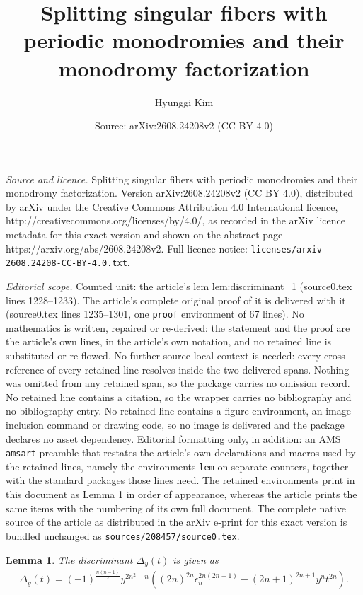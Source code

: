 \documentclass[10pt,a4paper]{amsart}
\title{Splitting singular fibers with periodic monodromies and their monodromy factorization}
\author{Hyunggi Kim}
\date{Source: arXiv:2608.24208v2 (CC BY 4.0)}
\newtheorem{lem}{Lemma}
\newcommand{\ep}{\epsilon}
\begin{document}
\maketitle

\noindent\emph{Source and licence.} Splitting singular fibers with periodic monodromies and their monodromy factorization. Version arXiv:2608.24208v2 (CC BY 4.0), distributed by arXiv under the Creative Commons Attribution 4.0 International licence, http://creativecommons.org/licenses/by/4.0/, as recorded in the arXiv licence metadata for this exact version and shown on the abstract page https://arxiv.org/abs/2608.24208v2. Full licence notice: \texttt{licenses/arxiv-2608.24208-CC-BY-4.0.txt}.\par\smallskip

\noindent\textit{Editorial scope.} Counted unit: the article's lem lem:discriminant\_1 (source0.tex lines 1228--1233). The article's complete original proof of it is delivered with it (source0.tex lines 1235--1301, one \texttt{proof} environment of 67 lines). No mathematics is written, repaired or re-derived: the statement and the proof are the article's own lines, in the article's own notation, and no retained line is substituted or re-flowed.  No further source-local context is needed: every cross-reference of every retained line resolves inside the two delivered spans.  Nothing was omitted from any retained span, so the package carries no omission record.  No retained line contains a citation, so the wrapper carries no bibliography and no bibliography entry.  No retained line contains a figure environment, an image-inclusion command or drawing code, so no image is delivered and the package declares no asset dependency.  Editorial formatting only, in addition: an AMS \texttt{amsart} preamble that restates the article's own declarations and macros used by the retained lines, namely the environments \texttt{lem} on separate counters, together with the standard packages those lines need.  The retained environments print in this document as Lemma 1 in order of appearance, whereas the article prints the same items with the numbering of its own full document.  The complete native source of the article as distributed in the arXiv e-print for this exact version is bundled unchanged as \texttt{sources/208457/source0.tex}.
\begin{lem} \label{lem:discriminant_1}
The discriminant $\Delta_y(t)$ is given as
\begin{align}
\Delta_y(t)=(-1)^{\frac{n(n-1)}{2}} y^{2n^2-n}((2n)^{2n}{\ep_n^{2n(2n+1)}}-(2n+1)^{2n+1}y^n t^{2n}).
\end{align}
\end{lem}
\end{document}
